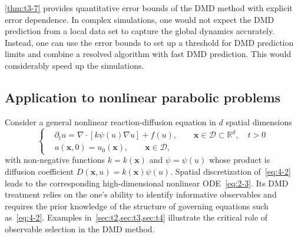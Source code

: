 \documentclass[10pt]{article}
\numberwithin{equation}{section}
\theoremstyle{plain}
\theoremstyle{remark}
\theoremstyle{remark}
\begin{document}
\cref{thm:t3-7} provides quantitative error bounds of the DMD method with explicit error dependence. In complex simulations, one would not expect the DMD prediction from a local data set to capture the global dynamics accurately. Instead, one can  use the error bounds to set up a threshold for DMD prediction limits and combine a resolved algorithm with fast DMD prediction. This would considerably speed up the simulations.

\subsection{Application to nonlinear parabolic problems}

Consider a general nonlinear reaction-diffusion equation in $d$ spatial dimensions
\begin{equation}\label{eq:4-2}
\left\{
\begin{aligned}
&\partial_t u = \nabla \cdot [k\psi(u)\nabla u] + f(u), \qquad \mathbf x \in \mathcal D \subset \mathbb R^d, \quad t > 0 \\
&u(\mathbf x,0) = u_0(\mathbf x), \qquad \mathbf x \in \mathcal D,
\end{aligned}
\right.
\end{equation}
with non-negative functions $k = k(\mathbf x)$ and $\psi = \psi(u)$ whose product is diffusion coefficient $D(\mathbf x, u) = k(\mathbf x) \psi(u)$. Spatial discretization of~\cref{eq:4-2} leads to the corresponding high-dimensional nonlinear ODE~\cref{eq:2-3}. Its DMD treatment relies on the one's ability to identify informative observables and requires the prior knowledge of the structure of governing equations such as~\cref{eq:4-2}.  Examples in~\cref{sec:t2,sec:t3,sec:t4} illustrate the critical role of observable selection in the DMD method.


\end{document}
